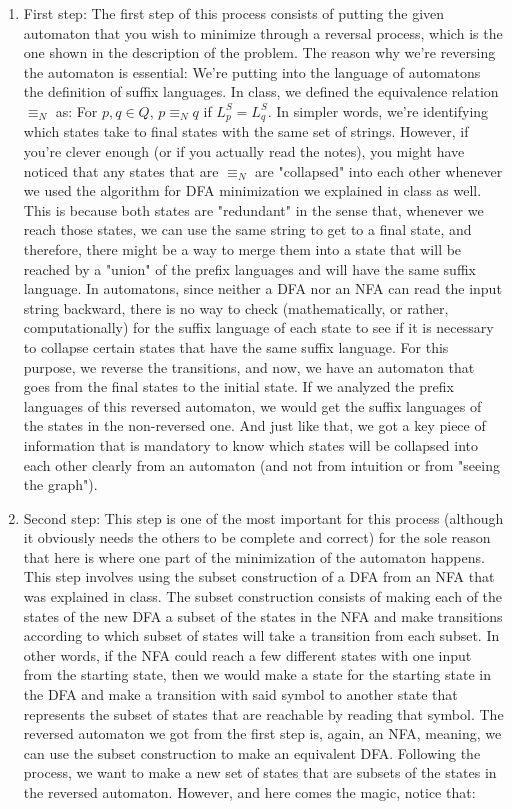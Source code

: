 \documentclass[12pt]{article}
\begin{document}
\begin{enumerate}
    \item First step: The first step of this process consists of putting the given automaton that you wish to minimize through a reversal process, which is the one shown in the description of the problem. The reason why we're reversing the automaton is essential: We're putting into the language of automatons the definition of suffix languages. In class, we defined the equivalence relation $\equiv_N$ as: For $p, q \in Q$, $p \equiv_N q$ if $L_p^S = L_q^S$. In simpler words, we're identifying which states take to final states with the same set of strings. However, if you're clever enough (or if you actually read the notes), you might have noticed that any states that are $\equiv_N$ are "collapsed" into each other whenever we used the algorithm for DFA minimization we explained in class as well. This is because both states are "redundant" in the sense that, whenever we reach those states, we can use the same string to get to a final state, and therefore, there might be a way to merge them into a state that will be reached by a "union" of the prefix languages and will have the same suffix language. In automatons, since neither a DFA nor an NFA can read the input string backward, there is no way to check (mathematically, or rather, computationally) for the suffix language of each state to see if it is necessary to collapse certain states that have the same suffix language. For this purpose, we reverse the transitions, and now, we have an automaton that goes from the final states to the initial state. If we analyzed the prefix languages of this reversed automaton, we would get the suffix languages of the states in the non-reversed one. And just like that, we got a key piece of information that is mandatory to know which states will be collapsed into each other clearly from an automaton (and not from intuition or from "seeing the graph").
    
    \item Second step: This step is one of the most important for this process (although it obviously needs the others to be complete and correct) for the sole reason that here is where one part of the minimization of the automaton happens. This step involves using the subset construction of a DFA from an NFA that was explained in class. The subset construction consists of making each of the states of the new DFA a subset of the states in the NFA and make transitions according to which subset of states will take a transition from each subset. In other words, if the NFA could reach a few different states with one input from the starting state, then we would make a state for the starting state in the DFA and make a transition with said symbol to another state that represents the subset of states that are reachable by reading that symbol. The reversed automaton we got from the first step is, again, an NFA, meaning, we can use the subset construction to make an equivalent DFA. Following the process, we want to make a new set of states that are subsets of the states in the reversed automaton. However, and here comes the magic, notice that:
    

\end{enumerate}
\end{document}
